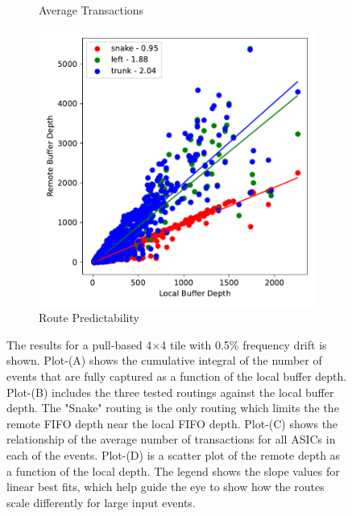 \begin{figure}
\begin{subfigure}[b]{0.475\textwidth}
      \caption[]%
      {{\small Average Transactions}}    
  \end{subfigure}
  \hfill
  \begin{subfigure}[b]{0.475\textwidth}   
      \centering 
      \includegraphics[width=\textwidth]{./images/mp60_16_slow_route_fits.pdf}
      \caption[]%
      {{\small Route Predictability}}    
  \end{subfigure}
  \caption[]
  {\small The results for a pull-based 4$\times$4 tile with 0.5\% frequency drift is shown. 
  Plot-(A) shows the cumulative integral of the number of events that are fully captured as a function of the local buffer depth.
  Plot-(B) includes the three tested routings against the local buffer depth. 
  The "Snake" routing is the only routing which limits the the remote FIFO depth near the local FIFO depth.
  Plot-(C) shows the relationship of the average number of transactions for all ASICs in each of the events.
  Plot-(D) is a scatter plot of the remote depth as a function of the local depth.
  The legend shows the slope values for linear best fits, which help guide the eye to show how the routes scale differently for large input events.
  } 
  \label{fig:mp60_slow_plots_for_digital_sim}
\end{figure}

